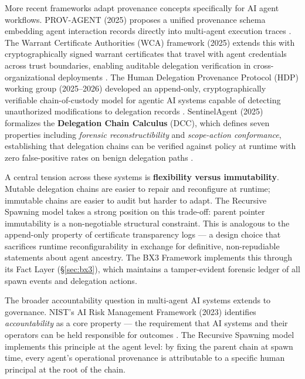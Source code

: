 More recent frameworks adapt provenance concepts specifically for AI agent workflows. PROV-AGENT (2025) proposes a unified provenance schema embedding agent interaction records directly into multi-agent execution traces \cite{prov-agent2025}. The Warrant Certificate Authorities (WCA) framework (2025) extends this with cryptographically signed warrant certificates that travel with agent credentials across trust boundaries, enabling auditable delegation verification in cross-organizational deployments \cite{wca2025}. The Human Delegation Provenance Protocol (HDP) working group (2025–2026) developed an append-only, cryptographically verifiable chain-of-custody model for agentic AI systems capable of detecting unauthorized modifications to delegation records \cite{hdp-draft,hdp-draft-2}. SentinelAgent (2025) formalizes the \textbf{Delegation Chain Calculus} (DCC), which defines seven properties including \textit{forensic reconstructibility} and \textit{scope-action conformance}, establishing that delegation chains can be verified against policy at runtime with zero false-positive rates on benign delegation paths \cite{sentinelagent2025}.

A central tension across these systems is \textbf{flexibility versus immutability}. Mutable delegation chains are easier to repair and reconfigure at runtime; immutable chains are easier to audit but harder to adapt. The Recursive Spawning model takes a strong position on this trade-off: parent pointer immutability is a non-negotiable structural constraint. This is analogous to the append-only property of certificate transparency logs \cite{laurie2013certificate} — a design choice that sacrifices runtime reconfigurability in exchange for definitive, non-repudiable statements about agent ancestry. The BX3 Framework implements this through its Fact Layer (\S\ref{sec:bx3}), which maintains a tamper-evident forensic ledger of all spawn events and delegation actions.

The broader accountability question in multi-agent AI systems extends to governance. NIST's AI Risk Management Framework (2023) identifies \textit{accountability} as a core property — the requirement that AI systems and their operators can be held responsible for outcomes \cite{nist2023}. The Recursive Spawning model implements this principle at the agent level: by fixing the parent chain at spawn time, every agent's operational provenance is attributable to a specific human principal at the root of the chain.

